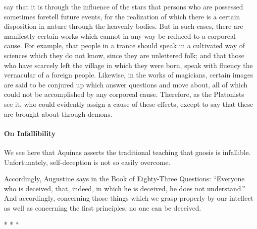 \begin{quotex}
 say that it is through the influence of the stars that persons who are possessed sometimes foretell future events, for the realization of which there is a certain disposition in nature through the heavenly bodies. But in such cases, there are manifestly certain works which cannot in any way be reduced to a corporeal cause. For example, that people in a trance should speak in a cultivated way of sciences which they do not know, since they are unlettered folk; and that those who have scarcely left the village in which they were born, speak with fluency the vernacular of a foreign people. Likewise, in the works of magicians, certain images are said to be conjured up which answer questions and move about, all of which could not be accomplished by any corporeal cause. Therefore, as the Platonists see it, who could evidently assign a cause of these effects, except to say that these are brought about through demons.

\end{quotex}
\paragraph{On Infallibility}
We see here that Aquinas asserts the traditional teaching that gnosis is infallible. Unfortunately, self-deception is not so easily overcome.

\begin{quotex}
Accordingly, Augustine says in the Book of Eighty-Three Questions: ``Everyone who is deceived, that, indeed, in which he is deceived, he does not understand.'' And accordingly, concerning those things which we grasp properly by our intellect as well as concerning the first principles, no one can be deceived.

\end{quotex}


\begin{center}* * *\end{center}


